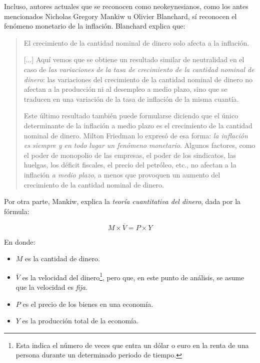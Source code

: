 \documentclass[12pt,a4paper,twoside]{book}
\begin{document}
Incluso, autores actuales que se reconocen como neokeynesianos, como los antes mencionados Nicholas Gregory Mankiw u Olivier Blanchard, sí reconocen el fenómeno monetario de la inflación. Blanchard explica que:

\begin{quotation}
El crecimiento de la cantidad nominal de dinero solo afecta a la inflación.

[...] Aquí vemos que se obtiene un resultado similar de neutralidad en el caso de \textit{las variaciones de la tasa de crecimiento de la cantidad nominal de dinero}: las variaciones del crecimiento de la cantidad nominal de dinero no afectan a la producción ni al desempleo a medio plazo, sino que se traducen en una variación de la tasa de inflación de la misma cuantía.

Este último resultado también puede formularse diciendo que el único determinante de la inflación a medio plazo es el crecimiento de la cantidad nominal de dinero. Milton Friedman lo expresó de esa forma: \textit{la inflación es siempre y en todo lugar un fenómeno monetario}. Algunos factores, como el poder de monopolio de las empresas, el poder de los sindicatos, las huelgas, los déficit fiscales, el precio del petróleo, etc., no afectan a la inflación \textit{a medio plazo}, a menos que provoquen un aumento del crecimiento de la cantidad nominal de dinero. \cite[pág. 234]{blanchard}
\end{quotation}

Por otra parte, Mankiw, explica la \textit{teoría cuantitativa del dinero}, dada por la fórmula:

\begin{equation}
M \times \overline{V} = P \times Y
\end{equation}

En donde:

\begin{itemize}
\item $ M $ es la cantidad de dinero.
\item $ \overline{V} $ es la velocidad del dinero\footnote{Esta indica el número de veces que entra un dólar o euro en la renta de una persona durante un determinado periodo de tiempo.}, pero que, en este punto de análisis, se asume que la velocidad es \textit{fija}.
\item $ P $ es el precio de los bienes en una economía.
\item $ Y $ es la producción total de la economía.
\end{itemize}
\end{document}
